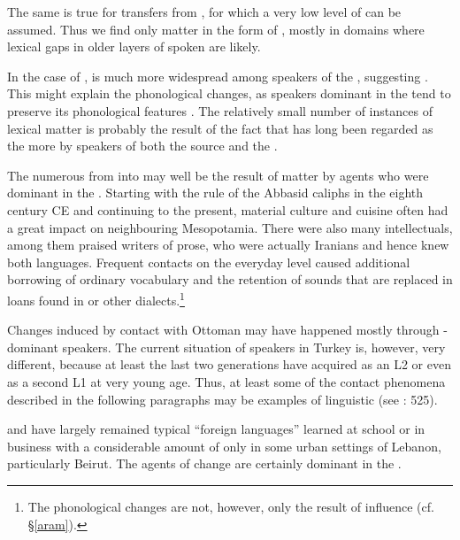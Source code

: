 \documentclass[output=paper]{langsci/langscibook}
\begin{document}
The same is true for transfers from , for which a very low level of  can be assumed. Thus we find only matter  in the form of , mostly in domains where lexical gaps in older layers of spoken  are likely. 

In the case of ,  is much more widespread among speakers of the , suggesting . This might explain the phonological changes, as speakers dominant in the  tend to preserve its phonological features \citep[532]{Lucas2015}. The relatively small number of instances of lexical matter  is probably the result of the fact that  has long been regarded as the more  by speakers of both the source and the .

The numerous  from  into   may well be the result of matter  by agents who were dominant in the  . Starting with the rule of the Abbasid caliphs in the eighth century CE and continuing to the present,  material culture and cuisine often had a great impact on neighbouring Mesopotamia. There were also many intellectuals, among them praised writers of  prose, who were actually Iranians and hence knew both languages. Frequent contacts on the everyday level caused additional borrowing of ordinary vocabulary and the retention of sounds that are replaced in  loans found in   or other dialects.\footnote{The phonological changes are not, however, only the result of  influence (cf. §\ref{aram}).} 

Changes induced by contact with Ottoman  may have happened mostly through -dominant speakers. The current situation of  speakers in Turkey is, however, very different, because at least the last two generations have acquired  as an L2 or even as a second L1 at very young age. Thus, at least some of the contact phenomena described in the following paragraphs may be examples of linguistic  (see \citealt{Lucas2015}: 525). 

 and  have largely remained typical “foreign languages” learned at school or in business with a considerable amount of  only in some urban settings of Lebanon, particularly Beirut. The agents of change are certainly dominant in the . 
\end{document}

